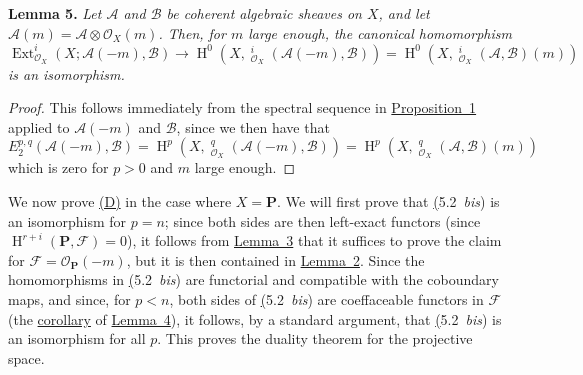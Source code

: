 \documentclass{article}
\newenvironment{itenv}[1]
  {\phantomsection\par\medskip\noindent\textbf{#1.}\itshape}
  {\medskip}
\newcommand{\scr}[1]{{\mathscr{#1}}}
\newcommand{\bb}{\mathbf}
\DeclareMathOperator{\Ext}{Ext}
\DeclareMathOperator{\shExt}{\underline{Ext}}
\DeclareMathOperator{\HH}{H}
\newcommand{\oldpage}[1]{\marginpar{\footnotesize$\Big\vert$ \textit{p.~#1}}}
\begin{document}
\oldpage{149-16}
\begin{itenv}{Lemma 5}
\label{lemma5}
  Let $\scr{A}$ and $\scr{B}$ be coherent algebraic sheaves on $X$, and let $\scr{A}(m)=\scr{A}\otimes\scr{O}_X(m)$.
  Then, for $m$ large enough, the canonical homomorphism
  \[
    \Ext_{\scr{O}_X}^i(X;\scr{A}(-m),\scr{B})
    \to \HH^0(X,\shExt_{\scr{O}_X}^i(\scr{A}(-m),\scr{B}))
    = \HH^0(X,\shExt_{\scr{O}_X}^i(\scr{A},\scr{B})(m))
  \]
  is an isomorphism.
\end{itenv}

\begin{proof}
  This follows immediately from the spectral sequence in \hyperref[proposition1]{Proposition~1} applied to $\scr{A}(-m)$ and $\scr{B}$, since we then have that
  \[
    E_2^{p,q}(\scr{A}(-m),\scr{B})
    = \HH^p(X,\shExt_{\scr{O}_X}^q(\scr{A}(-m),\scr{B}))
    = \HH^p(X,\shExt_{\scr{O}_X}^q(\scr{A},\scr{B})(m))
  \]
  which is zero for $p>0$ and $m$ large enough.
\end{proof}

We now prove \hyperref[(D)]{(D)} in the case where $X=\bb{P}$.
We will first prove that \hyperref[5.2bis](5.2~\emph{bis}) is an isomorphism for $p=n$;
since both sides are then left-exact functors (since $\HH^{r+i}(\bb{P},\scr{F})=0$), it follows from \hyperref[lemma3]{Lemma~3} that it suffices to prove the claim for $\scr{F}=\scr{O}_\bb{P}(-m)$, but it is then contained in \hyperref[lemma2]{Lemma~2}.
Since the homomorphisms in \hyperref[5.2bis](5.2~\emph{bis}) are functorial and compatible with the coboundary maps, and since, for $p<n$, both sides of \hyperref[5.2bis](5.2~\emph{bis}) are coeffaceable functors in $\scr{F}$ (the \hyperref[lemma3andlemma4corollary]{corollary} of \hyperref[lemma4]{Lemma~4}), it follows, by a standard argument, that \hyperref[5.2bis](5.2~\emph{bis}) is an isomorphism for all $p$.
This proves the duality theorem for the projective space.
\end{document}
